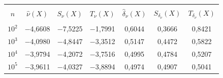 \begin{table}\small %


\begin{center}




\vspace*{2ex}





\tabcolsep=10.8pt


\begin{tabular}{|c|c|c|c|c|c|c|}


\hline


&&&&&&\\[-9pt]


 $n$& ${\hat \nu}(X)$& $S_\nu(X)$& $T_\nu(X)$& ${\hat \delta}_\nu(X)$& 


$S_{\delta_\nu}(X)$& $T_{\delta_\nu}(X)$\\[2pt]


\hline


&&&&&&\\[-9pt]


$10^2$& $-$4{,}6608& $-$7{,}5225& $-$1{,}7991& 0{,}6044& 0{,}3666& 0{,}8421\\


$10^3$& $-$4{,}0980& $-$4{,}8447& $-$3{,}3512& 0{,}5147& 0{,}4472& 0{,}5822\\


$10^4$& $-$3{,}9794& $-$4{,}2072& $-$3{,}7516& 0{,}4995& 0{,}4784& 0{,}5207\\


$10^5$& $-$3{,}9611& $-$4{,}0327& $-$3{,}8894& 0{,}4974& 0{,}4907& 0{,}5041\\


\hline


\end{tabular}


\end{center}


\end{table}




















